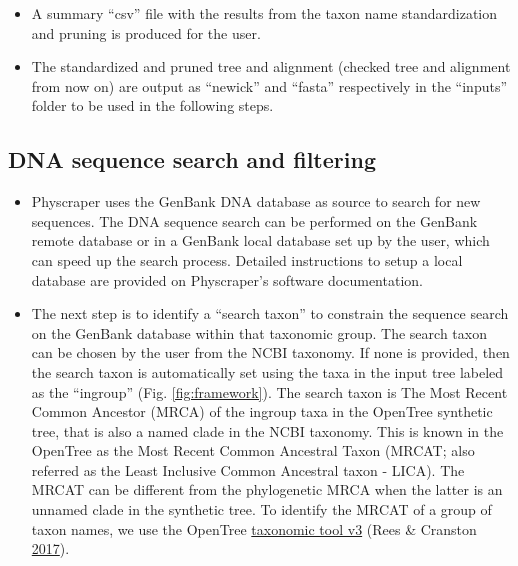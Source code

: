 \documentclass[]{article}
\begin{document}
\begin{itemize}
\item
  A summary ``csv'' file with the results from the taxon name standardization and pruning is produced for the user.
\item
  The standardized and pruned tree and alignment (checked tree and alignment from now on) are output as ``newick'' and ``fasta'' respectively in the ``inputs'' folder to be used in the following steps.
\end{itemize}

\hypertarget{dna-sequence-search-and-filtering}{%
\subsection{DNA sequence search and filtering}\label{dna-sequence-search-and-filtering}}

\begin{itemize}
\item
  Physcraper uses the GenBank DNA database as source to search for new sequences. The DNA sequence search can be performed on the GenBank remote database or in a GenBank local database set up by the user, which can speed up the search process. Detailed instructions to setup a local database are provided on Physcraper's software documentation.
\item
  The next step is to identify a ``search taxon'' to constrain the sequence search on the GenBank database within that taxonomic group.
  The search taxon can be chosen by the user from the NCBI taxonomy.
  If none is provided, then the search taxon is automatically set using the taxa in the input tree labeled as the ``ingroup'' (Fig. \ref{fig:framework}).
  The search taxon is The Most Recent Common Ancestor (MRCA) of the ingroup taxa in the OpenTree synthetic tree, that is also a named clade in the NCBI taxonomy.
  This is known in the OpenTree as the Most Recent Common
  Ancestral Taxon (MRCAT; also referred as the Least Inclusive Common Ancestral taxon - LICA).
  The MRCAT can be different from the phylogenetic MRCA when the latter is an unnamed clade in the synthetic tree.
  To identify the MRCAT of a group of taxon names, we use the OpenTree \href{https://github.com/OpenTreeOfLife/germinator/wiki/Taxonomy-API-v3\#mrca}{taxonomic tool v3} (Rees \& Cranston \protect\hyperlink{ref-rees2017automated}{2017}).


\end{itemize}
\end{document}
